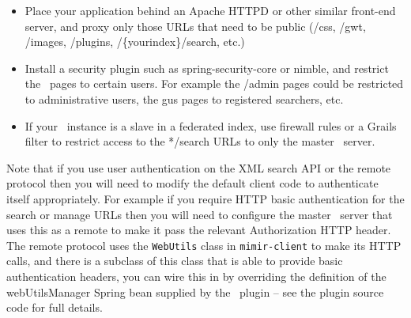 \begin{itemize}
\item Place your application behind an Apache HTTPD or other similar front-end
  server, and proxy only those URLs that need to be public (/css, /gwt,
  /images, /plugins, /\{yourindex\}/search, etc.)
\item Install a security plugin such as spring-security-core or nimble, and
  restrict the \Mimir\ pages to certain users.  For example the /admin pages
  could be restricted to administrative users, the gus pages to registered
  searchers, etc.
\item If your \Mimir\ instance is a slave in a federated index, use firewall
  rules or a Grails filter to restrict access to the */search URLs to only the
  master \Mimir\ server.
\end{itemize}

Note that if you use user authentication on the XML search API or the remote
protocol then you will need to modify the default client code to authenticate
itself appropriately.  For example if you require HTTP basic authentication for
the search or manage URLs then you will need to configure the master \Mimir\
server that uses this as a remote to make it pass the relevant Authorization
HTTP header.  The remote protocol uses the {\tt WebUtils} class in
{\tt mimir-client} to make its HTTP calls, and there is a subclass of this
class that is able to provide basic authentication headers, you can wire this
in by overriding the definition of the webUtilsManager Spring bean supplied by
the \Mimir\ plugin -- see the plugin source code for full details.
